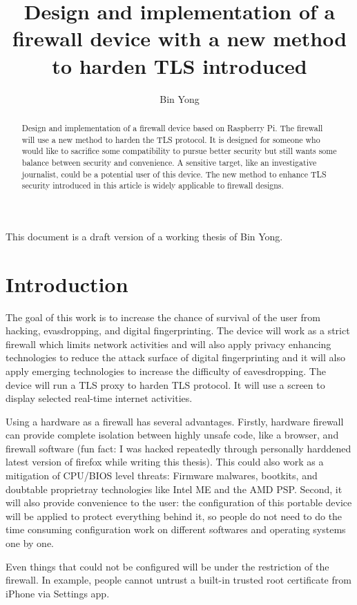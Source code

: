 \documentclass[mscthesis]{usiinfthesis}
\title{Design and implementation of a firewall device with a new method to harden TLS introduced} %
\author{Bin Yong} %
\begin{document}
\maketitle %

\frontmatter %

\begin{abstract}
  Design and implementation of a firewall device based on Raspberry Pi.
  The firewall will use a new method to harden the TLS protocol. It is
  designed for someone who would like to sacrifice some compatibility
  to pursue better security but still wants some balance between
  security and convenience. A sensitive target, like an investigative
  journalist, could be a potential user of this device. The new method
  to enhance TLS security introduced in this article is widely
  applicable to firewall designs.

\end{abstract}

\begin{acknowledgements}
  This document is a draft version of a working thesis of Bin Yong.
\end{acknowledgements}

\tableofcontents
\listoffigures %
\listoftables %

\mainmatter

\chapter{Introduction}
The goal of this work is to increase the chance of survival of the user from hacking, evasdropping, and digital fingerprinting. The device will work as a strict firewall which limits network activities and will also apply privacy enhancing technologies to reduce the attack surface of digital fingerprinting and it will also apply emerging technologies to increase the difficulty of eavesdropping. The device will run a TLS proxy to harden TLS protocol. It will use a screen to display selected real-time
internet activities.\par
Using a hardware as a firewall has several advantages. Firstly, hardware
firewall can provide complete isolation between highly unsafe code,
like a browser, and firewall software (fun fact: I was hacked repeatedly
through personally harddened latest version of firefox while writing this
thesis). This could also work as a mitigation of CPU/BIOS level threats:
Firmware malwares, bootkits, and doubtable proprietray technologies like
Intel ME and the AMD PSP. Second, it will also provide convenience to the
user: the configuration of this portable device will be applied to protect
everything behind it, so people do not need to do the time consuming
configuration work on different softwares and operating systems one by one. \par
Even things that could not be configured will be under the restriction of the firewall. In example, people cannot untrust a built-in trusted root certificate from iPhone via Settings app.
\end{document}
